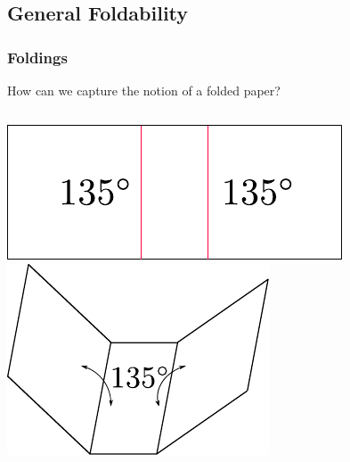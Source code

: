 \documentclass{beamer}
\begin{document}
\subsection{General Foldability}

\begin{frame}
\frametitle{Foldings}

\begin{block}{}
How can we capture the notion of a folded paper? 
\end{block}

\pause
\begin{columns}[c]
\includegraphics[width=\textwidth]{knot_pix/unfolded.pdf}
\pause
{}
\includegraphics[width=\textwidth]{knot_pix/folded-valid.pdf}
\end{columns}
\end{frame}
\end{document}
